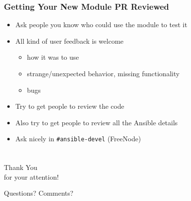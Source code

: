 \documentclass{beamer}
\begin{document}
  \begin{frame}[fragile]
    \frametitle{Getting Your New Module PR Reviewed}
    \begin{itemize}
      \item Ask people you know who could use the module to test it
      \item All kind of user feedback is welcome
        \begin{itemize}
          \item how it was to use
          \item strange/unexpected behavior, missing functionality
          \item bugs
        \end{itemize}
      \item<2-> Try to get people to review the code
      \item<2-> Also try to get people to review all the Ansible details
      \item<2-> Ask nicely in \verb|#ansible-devel| (FreeNode)
    \end{itemize}
  \end{frame}

  \section*{}
  \begin{frame}
    \begin{center}
      \Huge Thank You\\
      for your attention!

      \vspace{1.5cm}

      \LARGE Questions? Comments?
    \end{center}
  \end{frame}
\end{document}
